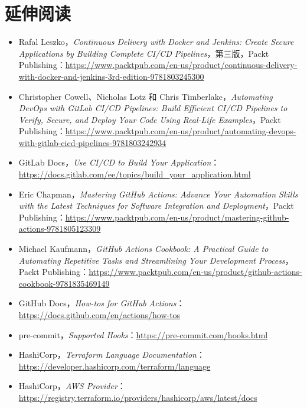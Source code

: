 \section{延伸阅读}

\begin{itemize}
\item Rafal Leszko，\emph{Continuous Delivery with Docker and Jenkins: Create Secure Applications by Building Complete CI/CD Pipelines}，第三版，Packt Publishing：\href{https://www.packtpub.com/en-us/product/continuous-delivery-with-docker-and-jenkins-3rd-edition-9781803245300}{https://www.packtpub.com/en-us/product/continuous-delivery-with-docker-and-jenkins-3rd-edition-9781803245300}
\item Christopher Cowell、Nicholas Lotz 和 Chris Timberlake，\emph{Automating DevOps with GitLab CI/CD Pipelines: Build Efficient CI/CD Pipelines to Verify, Secure, and Deploy Your Code Using Real-Life Examples}，Packt Publishing：\href{https://www.packtpub.com/en-us/product/automating-devops-with-gitlab-cicd-pipelines-9781803242934}{https://www.packtpub.com/en-us/product/automating-devops-with-gitlab-cicd-pipelines-9781803242934}
\item GitLab Docs，\emph{Use CI/CD to Build Your Application}：\href{https://docs.gitlab.com/ee/topics/build_your_application.html}{https://docs.gitlab.com/ee/topics/build\_your\_application.html}
\item Eric Chapman，\emph{Mastering GitHub Actions: Advance Your Automation Skills with the Latest Techniques for Software Integration and Deployment}，Packt Publishing：\href{https://www.packtpub.com/en-us/product/mastering-github-actions-9781805123309}{https://www.packtpub.com/en-us/product/mastering-github-actions-9781805123309}
\item Michael Kaufmann，\emph{GitHub Actions Cookbook: A Practical Guide to Automating Repetitive Tasks and Streamlining Your Development Process}，Packt Publishing：\href{https://www.packtpub.com/en-us/product/github-actions-cookbook-9781835469149}{https://www.packtpub.com/en-us/product/github-actions-cookbook-9781835469149}
\item GitHub Docs，\emph{How-tos for GitHub Actions}：\href{https://docs.github.com/en/actions/how-tos}{https://docs.github.com/en/actions/how-tos}
\item pre-commit，\emph{Supported Hooks}：\href{https://pre-commit.com/hooks.html}{https://pre-commit.com/hooks.html}
\item HashiCorp，\emph{Terraform Language Documentation}：\href{https://developer.hashicorp.com/terraform/language}{https://developer.hashicorp.com/terraform/language}
\item HashiCorp，\emph{AWS Provider}：\href{https://registry.terraform.io/providers/hashicorp/aws/latest/docs}{https://registry.terraform.io/providers/hashicorp/aws/latest/docs}
\end{itemize}

